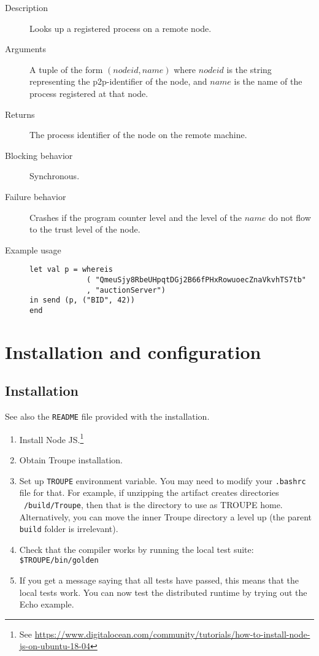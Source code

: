 \begin{description}
    \item [Description] Looks up a registered process on a remote node.
    \item [Arguments] A tuple of the form $(\mathit{nodeid}, \mathit{name})$ where $\mathit{nodeid}$ is the string representing the p2p-identifier of the node, and $\mathit{name}$ is the name of the process registered at that node.
    \item [Returns] The process identifier of the node on the remote machine. 
    \item [Blocking behavior] Synchronous. 
    \item [Failure behavior] Crashes if the program counter level and the level of the $\mathit{name}$ do not flow to the trust level of the node.
    \item [Example usage]
\begin{minipage}[t]{30em}
\begin{verbatim}
let val p = whereis 
             ( "QmeuSjy8RbeUHpqtDGj2B66fPHxRowuoecZnaVkvhTS7tb"
             , "auctionServer")
in send (p, ("BID", 42))
end
\end{verbatim}    
\end{minipage}
\end{description}


\clearpage
\section{Installation and configuration}
\label{appendix:installationandconfig}
\subsection{Installation}
See also the {\tt README} file provided with the installation.
\begin{enumerate}
    \item Install Node JS.\footnote{
    See \url{https://www.digitalocean.com/community/tutorials/how-to-install-node-js-on-ubuntu-18-04}}
    \item Obtain Troupe installation.
    \item Set up {\tt TROUPE} environment variable. You may need to modify your {\tt .bashrc} file for that. For example, if unzipping the artifact creates directories {\tt ~/build/Troupe}, then that is the directory to use as TROUPE home. Alternatively, you can move the inner Troupe directory a level up (the parent {\tt build} folder is irrelevant).
    \item Check that the compiler works by running the local test suite: {\tt \$TROUPE/bin/golden}
    \item If you get a message saying that all tests have passed, this means that the local tests work. You can now test the distributed runtime by trying out the Echo example.
\end{enumerate}

